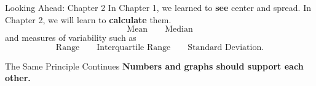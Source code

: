 \documentclass[aspectratio=169]{beamer}
\begin{document}
\begin{frame}{Looking Ahead: Chapter 2}
  In Chapter 1, we learned to \textbf{see} center and spread.
  \vspace{0.2cm}
  In Chapter 2, we will learn to \textbf{calculate} them.
  \[
    \text{Mean} \qquad \text{Median}
  \]
  and measures of variability such as
  \[
    \text{Range} \qquad \text{Interquartile Range} \qquad \text{Standard Deviation}.
  \]
  \vspace{0.25cm}
  \begin{block}{The Same Principle Continues}
    \textbf{Numbers and graphs should support each other.}
  \end{block}
\end{frame}
\end{document}
